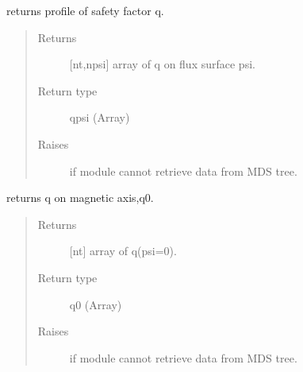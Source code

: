 \documentclass[letterpaper,10pt,english]{sphinxmanual}
\begin{document}
\begin{fulllineitems}
\begin{fulllineitems}
\begin{quote}
\begin{description}
\end{description}\end{quote}

\end{fulllineitems}


\begin{fulllineitems}
\label{\detokenize{eqtools:eqtools.TCVLIUQE.TCVLIUQETree.getQProfile}}
returns profile of safety factor q.
\begin{quote}\begin{description}
\item[{Returns}] \leavevmode
{[}nt,npsi{]} array of q on flux surface psi.

\item[{Return type}] \leavevmode
qpsi (Array)

\item[{Raises}] \leavevmode
{} \textendash{} if module cannot retrieve data from MDS tree.

\end{description}\end{quote}

\end{fulllineitems}


\begin{fulllineitems}
\label{\detokenize{eqtools:eqtools.TCVLIUQE.TCVLIUQETree.getQ0}}
returns q on magnetic axis,q0.
\begin{quote}\begin{description}
\item[{Returns}] \leavevmode
{[}nt{]} array of q(psi=0).

\item[{Return type}] \leavevmode
q0 (Array)

\item[{Raises}] \leavevmode
{} \textendash{} if module cannot retrieve data from MDS tree.

\end{description}\end{quote}


\end{fulllineitems}
\end{fulllineitems}
\end{document}
